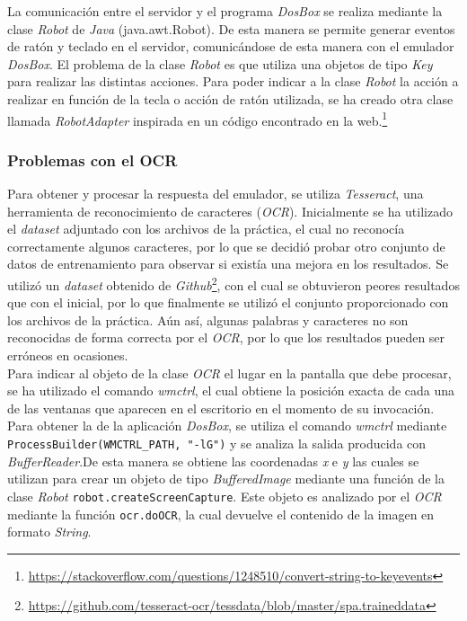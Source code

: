 \documentclass[10pt,a4paper]{article}
\begin{document}
La comunicación entre el servidor y el programa \textit{DosBox} se realiza mediante la clase \textit{Robot} de \textit{Java} (java.awt.Robot). De esta manera se permite generar eventos de ratón y teclado en el servidor, comunicándose de esta manera con el emulador \textit{DosBox}. El problema de la clase \textit{Robot} es que utiliza una objetos de tipo \textit{Key} para realizar las distintas acciones. Para poder indicar a la clase \textit{Robot} la acción a realizar en función de la tecla o acción de ratón utilizada, se ha creado otra clase llamada \textit{RobotAdapter} inspirada en un código encontrado en la web.\footnote{\url{https://stackoverflow.com/questions/1248510/convert-string-to-keyevents}}\\

\subsubsection{Problemas con el OCR}

Para obtener y procesar la respuesta del emulador, se utiliza \textit{Tesseract}, una herramienta de reconocimiento de caracteres (\textit{OCR}). Inicialmente se ha utilizado el \textit{dataset} adjuntado con los archivos de la práctica, el cual no reconocía correctamente algunos caracteres, por lo que se decidió probar otro conjunto de datos de entrenamiento para observar si existía una mejora en los resultados. Se utilizó un \textit{dataset} obtenido de \textit{Github}\footnote{\url{https://github.com/tesseract-ocr/tessdata/blob/master/spa.traineddata}}, con el cual se obtuvieron peores resultados que con el inicial, por lo que finalmente se utilizó el conjunto proporcionado con los archivos de la práctica. Aún así, algunas palabras y caracteres no son reconocidas de forma correcta por el \textit{OCR}, por lo que los resultados pueden ser erróneos en ocasiones. \\
Para indicar al objeto de la clase \textit{OCR} el lugar en la pantalla que debe procesar, se ha utilizado el comando \textit{wmctrl}, el cual obtiene la posición exacta de cada una de las ventanas que aparecen en el escritorio en el momento de su invocación. Para obtener la de la aplicación \textit{DosBox}, se utiliza el comando \textit{wmctrl} mediante \texttt{ProcessBuilder(WMCTRL\_PATH, "-lG")} y se analiza la salida producida con \textit{BufferReader}.De esta manera se obtiene las coordenadas \textit{x} e \textit{y} las cuales se utilizan para crear un objeto de tipo \textit{BufferedImage} mediante una función de la clase \textit{Robot} \texttt{robot.createScreenCapture}. Este objeto es analizado por el \textit{OCR} mediante la función \texttt{ocr.doOCR}, la cual devuelve el contenido de la imagen en formato \textit{String}.\\
\end{document}
